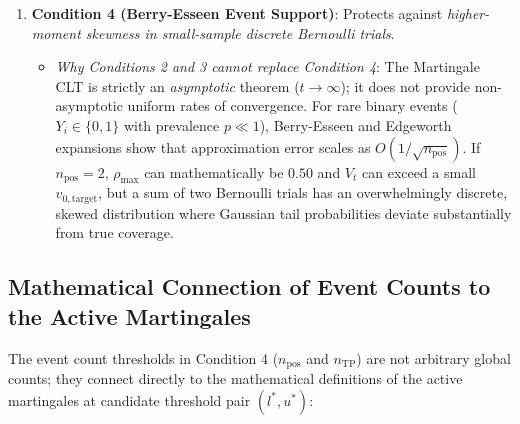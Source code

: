 \documentclass[11pt,a4paper]{article}
\begin{document}
\begin{enumerate}[leftmargin=*]
\begin{itemize}
        \item \emph{Why Condition 2 cannot replace Condition 3}: Suppose $V_t = 10.0 \ge 0.05 v_{0, \text{target}}$ is large. But $V_t$ consists of $99$ observations with increment $0$ and \textbf{one single observation with a large importance weight} $w_i = 60$ contributing $90\%$ of the variance ($\rho_{\max} = 0.90$). The process is a single-jump step function, not a continuous Gaussian path! Condition 3 catches this failure mode.
    \end{itemize}
    \item \textbf{Condition 4 (Berry-Esseen Event Support)}: Protects against \emph{higher-moment skewness in small-sample discrete Bernoulli trials}.
    \begin{itemize}
        \item \emph{Why Conditions 2 and 3 cannot replace Condition 4}: The Martingale CLT is strictly an \emph{asymptotic} theorem ($t \to \infty$); it does not provide non-asymptotic uniform rates of convergence. For rare binary events ($Y_i \in \{0, 1\}$ with prevalence $p \ll 1$), Berry-Esseen and Edgeworth expansions show that approximation error scales as $O(1/\sqrt{n_{\text{pos}}})$. If $n_{\text{pos}} = 2$, $\rho_{\max}$ can mathematically be $0.50$ and $V_t$ can exceed a small $v_{0, \text{target}}$, but a sum of two Bernoulli trials has an overwhelmingly discrete, skewed distribution where Gaussian tail probabilities deviate substantially from true coverage.
    \end{itemize}
\end{enumerate}

\subsection{Mathematical Connection of Event Counts to the Active Martingales}
The event count thresholds in Condition 4 ($n_{\text{pos}}$ and $n_{\text{TP}}$) are not arbitrary global counts; they connect directly to the mathematical definitions of the active martingales at candidate threshold pair $(l^*, u^*)$:
\end{document}
